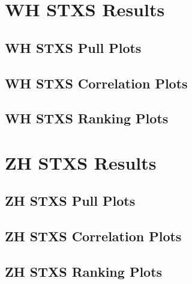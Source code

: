 \documentclass{umassthesis}          %
\begin{document}
\chapter{WH STXS Results}\label{app:wh_stxs_results_appendix}
\section{WH STXS Pull Plots}\label{app:wh_stxs_pull_plots}

\section{WH STXS Correlation Plots}\label{app:wh_stxs_correlation_plots}

\section{WH STXS Ranking Plots}\label{app:wh_stxs_ranking_plots}


\chapter{ZH STXS Results}\label{app:zh_stxs_results_appendix}
\section{ZH STXS Pull Plots}\label{app:zh_stxs_pull_plots}

\section{ZH STXS Correlation Plots}\label{app:zh_stxs_correlation_plots}

\section{ZH STXS Ranking Plots}\label{app:zh_stxs_ranking_plots}


\end{document}
